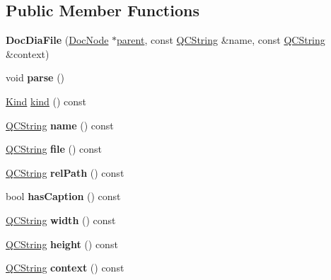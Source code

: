 \subsection*{Public Member Functions}
\begin{DoxyCompactItemize}
\item 
\mbox{\label{class_doc_dia_file_ae7104929c7d10268ac485a3380f32bd3}} 
{\bfseries Doc\+Dia\+File} (\mbox{\hyperlink{class_doc_node}{Doc\+Node}} $\ast$\mbox{\hyperlink{class_doc_node_a73e8ad29a91cfceb0968eb00db71a23d}{parent}}, const \mbox{\hyperlink{class_q_c_string}{Q\+C\+String}} \&name, const \mbox{\hyperlink{class_q_c_string}{Q\+C\+String}} \&context)
\item 
\mbox{\label{class_doc_dia_file_a1c65f8a1b4672f6f0de332855eb33632}} 
void {\bfseries parse} ()
\item 
\mbox{\hyperlink{class_doc_node_aebd16e89ca590d84cbd40543ea5faadb}{Kind}} \mbox{\hyperlink{class_doc_dia_file_a7e9feefcddd9adfb9ea98552e3c0e62d}{kind}} () const
\item 
\mbox{\label{class_doc_dia_file_a2499dfd6c0b0838ce0a86d516f20a06f}} 
\mbox{\hyperlink{class_q_c_string}{Q\+C\+String}} {\bfseries name} () const
\item 
\mbox{\label{class_doc_dia_file_a5e536c143b6fb21b92aa34e7b9280081}} 
\mbox{\hyperlink{class_q_c_string}{Q\+C\+String}} {\bfseries file} () const
\item 
\mbox{\label{class_doc_dia_file_a1d403fdc8f148f59d885b258872a42ef}} 
\mbox{\hyperlink{class_q_c_string}{Q\+C\+String}} {\bfseries rel\+Path} () const
\item 
\mbox{\label{class_doc_dia_file_a92fa1af00deef0de93d6a14b4b0ff2f0}} 
bool {\bfseries has\+Caption} () const
\item 
\mbox{\label{class_doc_dia_file_abcce23671578d6e621834a4f98a837b9}} 
\mbox{\hyperlink{class_q_c_string}{Q\+C\+String}} {\bfseries width} () const
\item 
\mbox{\label{class_doc_dia_file_ab47ec335e031c3ce7fdb727d6e87d309}} 
\mbox{\hyperlink{class_q_c_string}{Q\+C\+String}} {\bfseries height} () const
\item 
\mbox{\label{class_doc_dia_file_a8ffa680b9c4769e9f73985055970f935}} 
\mbox{\hyperlink{class_q_c_string}{Q\+C\+String}} {\bfseries context} () const
\end{DoxyCompactItemize}
